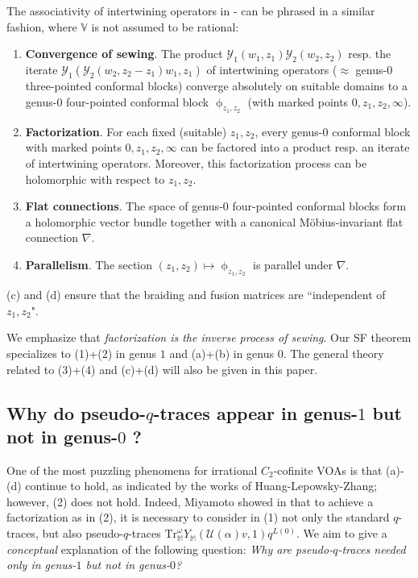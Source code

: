 \documentclass[11pt,b5paper,notitlepage]{article}
\theoremstyle{definition}
\theoremstyle{plain}
\newcommand{\mc}{\mathcal}
\newcommand{\Tr}{\mathrm{Tr}}
\newcommand{\Vbb}{\mathbb V}
\newcommand{\Mbb}{\mathbb M}
\newcommand{\<}{\left\langle}
\renewcommand{\>}{\right\rangle}
\numberwithin{equation}{subsection}
\begin{document}
The associativity of intertwining operators in \cite{HLZ1,HLZ2}-\cite{HLZ8} can be phrased in a similar fashion, where $\Vbb$ is not assumed to be rational:

\begin{enumerate}[label=(\alph*)]
\item \textbf{Convergence of sewing}. The product $\mc Y_1(w_1,z_1)\mc Y_2(w_2,z_2)$ resp. the iterate $\mc Y_1(\mc Y_2(w_2,z_2-z_1)w_1,z_1)$ of intertwining operators ($\approx$ genus-$0$ three-pointed conformal blocks) converge absolutely on suitable domains to a genus-$0$ four-pointed conformal block $\upphi_{z_1,z_2}$ (with marked points $0,z_1,z_2,\infty$).
\item \textbf{Factorization}. For each fixed (suitable) $z_1,z_2$, every genus-$0$ conformal block with marked points $0,z_1,z_2,\infty$ can be factored into a product resp. an iterate of intertwining operators. Moreover, this factorization process can be holomorphic with respect to $z_1,z_2$.
\item \textbf{Flat connections}. The space of  genus-$0$ four-pointed conformal blocks form a holomorphic vector bundle together with a canonical M\"obius-invariant flat connection $\nabla$. 
\item \textbf{Parallelism}. The section $(z_1,z_2)\mapsto \upphi_{z_1,z_2}$ is parallel under $\nabla$.
\end{enumerate}
(c) and (d) ensure that the braiding and fusion matrices are ``independent of $z_1,z_2$". 

We emphasize that \textit{factorization is the inverse process of sewing}. Our SF theorem specializes to (1)+(2) in genus $1$ and (a)+(b) in genus $0$. The general theory related to (3)+(4) and (c)+(d) will also be given in this paper. 




\subsection{Why do pseudo-$q$-traces appear in genus-$1$ but not in genus-$0$ ?}\label{lbb60}



One of the most puzzling phenomena for irrational $C_2$-cofinite VOAs is that (a)-(d) continue to hold, as indicated by the works of Huang-Lepowsky-Zhang; however, (2) does not hold. Indeed, Miyamoto showed in \cite{Miy-modular-invariance} that to achieve a factorization as in (2), it is necessary to consider in (1) not only the standard $q$-traces, but also pseudo-$q$-traces $\Tr_\Mbb^\omega Y_\Mbb(\mc U(\alpha)v,1)q^{L(0)}$. We aim to give a \textit{conceptual} explanation of the following question: \textit{Why are pseudo-$q$-traces needed only in genus-$1$ but not in genus-$0$?}
\end{document}
